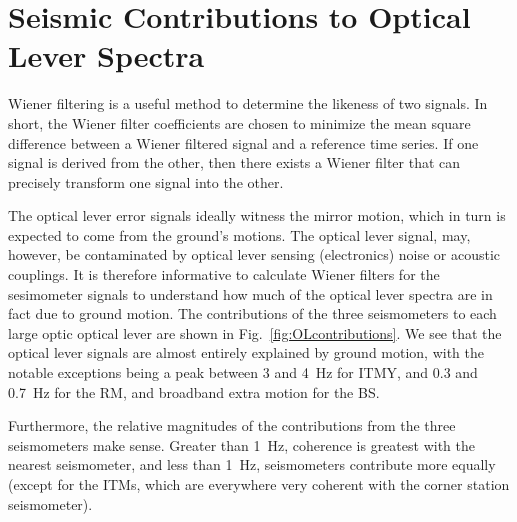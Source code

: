 \section{Seismic Contributions to Optical Lever Spectra}
\label{sec:oplev_contributions}
Wiener filtering \cite{Wiener1975Extrapolation} is a useful method to
determine the likeness of two signals. In short, the Wiener filter
coefficients are chosen to minimize the mean square difference between
a Wiener filtered signal and a reference time series. If one signal is
derived from the other, then there exists a Wiener filter that can
precisely transform one signal into the other.



The optical lever error signals ideally witness the mirror motion,
which in turn is expected to come from the ground's motions. The
optical lever signal, may, however, be contaminated by optical lever
sensing (electronics) noise or acoustic couplings. It is therefore
informative to calculate Wiener filters for the sesimometer signals to
understand how much of the optical lever spectra are in fact due to
ground motion. The contributions of the three seismometers to each
large optic optical lever are shown in
Fig.~\ref{fig:OLcontributions}. We see that the optical lever signals
are almost entirely explained by ground motion, with the notable
exceptions being a peak between 3 and 4~Hz for ITMY, and 0.3 and
0.7~Hz for the RM, and broadband extra motion for the BS.

Furthermore, the relative magnitudes of the contributions from the
three seismometers make sense. Greater than 1~Hz, coherence is
greatest with the nearest seismometer, and less than 1~Hz,
seismometers contribute more equally (except for the ITMs, which are
everywhere very coherent with the corner station seismometer).

